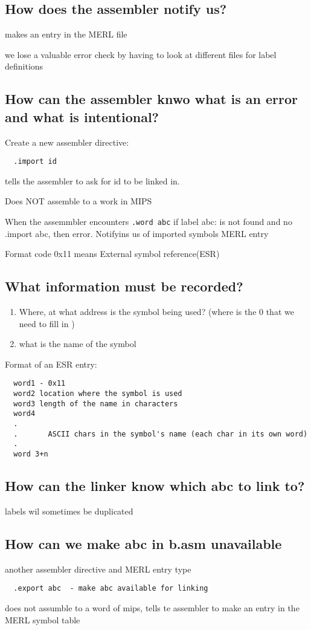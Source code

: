 \documentclass[11pt]{amsart}
\begin{document}
\subsection{How does the assembler notify us?}
\par makes an entry in the MERL file
\par we lose a valuable error check by having to look at different files for
label definitions
\subsection{How can the assembler knwo what is an error and what is
  intentional?}
\par Create a new assembler directive:
\begin{verbatim}
  .import id
\end{verbatim}
\par tells the assembler to ask for id to be linked in.
\par Does NOT assemble to a work in MIPS
\par When the assemmbler encounters \verb|.word abc| if label abc: is not found
and no .import abc, then error. Notifyins us of imported symbols MERL entry
\par Format code 0x11 means External symbol reference(ESR)
\subsection{What information must be recorded?
}
\begin{enumerate}
  \item Where, at what address is the symbol being used? (where is the 0 that
    we need to fill in )
  \item what is the name of the symbol
\end{enumerate}
\par Format of an ESR entry:
\begin{verbatim}
  word1 - 0x11
  word2 location where the symbol is used
  word3 length of the name in characters
  word4
  .
  .       ASCII chars in the symbol's name (each char in its own word)
  .
  word 3+n
\end{verbatim}
\subsection{How can the linker know which abc to link to?}
\par labels wil sometimes be duplicated
\subsection{How can we make abc in b.asm unavailable}
\par another assembler directive and MERL entry type
\begin{verbatim}
  .export abc  - make abc available for linking
\end{verbatim}
\par does not assumble to a word of mips, tells te assembler to make an entry
in the MERL symbol table
\end{document}

